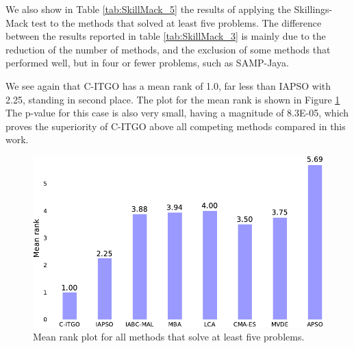 We also show in Table \ref{tab:SkillMack_5} the results of applying the Skillings-Mack test to the methods that solved at least five problems. The difference between the results reported in table \ref{tab:SkillMack_3} is mainly due to the reduction of the number of methods, and the exclusion of some methods that performed well, but in four or fewer problems, such as SAMP-Jaya.



We see again that C-ITGO has a mean rank of 1.0, far less than IAPSO with 2.25, standing in second place. The plot for the mean rank is shown in Figure \ref{fig:SkillMack_5} The p-value for this case is also very small, having a magnitude of 8.3E-05, which proves the superiority of C-ITGO above all competing methods compared in this work.


\begin{figure}[h]
    \begin{center}
    \includegraphics[scale=0.6]{Imgs/SkillMack_5-crop.pdf}
    \end{center}
    \captionsetup{justification=centering}
    \vspace*{-4mm}
    \caption{Mean rank plot for all methods that solve at least five problems.}\label{fig:SkillMack_5}
\end{figure}

